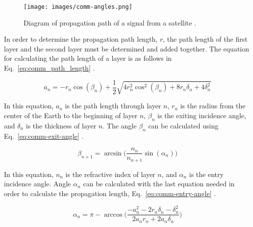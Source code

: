 \documentclass[12pt]{article}
\begin{document}
\begin{figure}[ht]
\centering
  \texttt{[image: images/comm-angles.png]}
\caption{Diagram of propagation path of a signal from a satellite \cite[p.~12]{ITU-R}.}
\label{fig:comm_propagation_path}
\end{figure}

In order to determine the propagation path length, $r$, the path length of the first layer and the second layer must be determined and added together. The equation for calculating the path length of a layer is as follows in Eq.~\ref{eq:comm_path_length} \cite[p.~9]{ITU-R}.

\begin{equation}\label{eq:comm_path_length}
a_n = -r_n\cos(\beta_n) + \frac{1}{2}\sqrt{4r_n^2\cos^2(\beta_n)+8r_n\delta_n+4\delta_n^2} 
\end{equation}

In this equation, $a_n$ is the path length through layer $n$, $r_n$ is the radius from the center of the Earth to the beginning of layer $n$, $\beta_n$ is the exiting incidence angle, and $\delta_n$ is the thickness of layer $n$.
The angle $\beta_n$ can be calculated using Eq.~\ref{eq:comm-exit-angle} \cite[p.~10]{ITU-R}.

\begin{equation}\label{eq:comm-exit-angle}
\beta_{n+1} = \arcsin\biggl(\frac{n_n}{n_{n+1}}\sin(\alpha_n)\biggr) 
\end{equation}

In this equation, $n_n$ is the refractive index of layer $n$, and $\alpha_n$ is the entry incidence angle. Angle $\alpha_n$ can be calculated with the last equation needed in order to calculate the propagation length, Eq.~\ref{eq:comm-entry-angle} \cite[p.~9]{ITU-R}.

\begin{equation}\label{eq:comm-entry-angle}
\alpha_n = \pi - \arccos \biggl(\frac{-a_n^2 - 2r_n\delta_n - \delta_n^2}{2a_n r_n + 2a_n \delta_n}\biggr) 
\end{equation}
\end{document}
